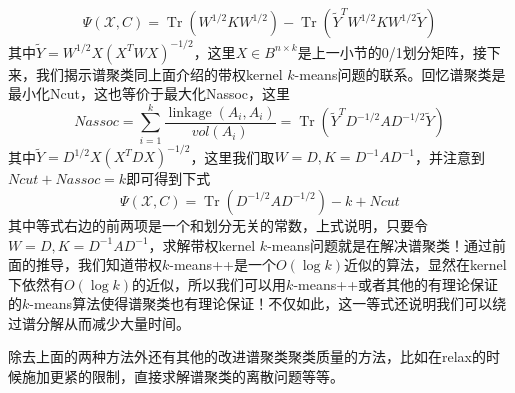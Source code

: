 \begin{equation}
	\Psi(\mathcal{X},C) = \operatorname{Tr}\left(W^{1 / 2} K W^{1 / 2}\right)-\operatorname{Tr}\left(\tilde{Y}^{T} W^{1 / 2} K W^{1 / 2} \tilde{Y}\right)
\end{equation}
其中$\tilde{Y} = W^{1/2}X(X^TWX)^{-1/2}$，这里$X\in B^{n\times k}$是上一小节的0/1划分矩阵，接下来，我们揭示谱聚类同上面介绍的带权kernel $k$-means问题的联系。回忆谱聚类是最小化Ncut，这也等价于最大化Nassoc，这里
\begin{equation}
	Nassoc=\sum_{i=1}^k \frac{\operatorname{linkage}(A_i,A_i)}{vol(A_i)} = \operatorname{Tr}(\tilde{Y}^TD^{-1/2}AD^{-1/2}\tilde{Y})
\end{equation}
其中$\tilde{Y} = D^{1/2}X(X^TDX)^{-1/2}$，这里我们取$W=D,K=D^{-1}AD^{-1}$，并注意到$Ncut+Nassoc=k$即可得到下式
\begin{equation}
	\label{eq: wkk_spectral_clustering}
	\Psi(\mathcal{X},C) = \operatorname{Tr}\left(D^{-1 / 2} A D^{-1 / 2}\right) - k + Ncut
\end{equation}
其中等式右边的前两项是一个和划分无关的常数，上式说明，只要令$W=D,K=D^{-1}AD^{-1}$，求解带权kernel $k$-means问题就是在解决谱聚类！通过前面的推导，我们知道带权$k$-means++是一个$O(\log k)$近似的算法，显然在kernel下依然有$O(\log k)$的近似，所以我们可以用$k$-means++或者其他的有理论保证的$k$-means算法使得谱聚类也有理论保证！不仅如此，这一等式还说明我们可以绕过谱分解从而减少大量时间。

除去上面的两种方法外还有其他的改进谱聚类聚类质量的方法，比如在relax的时候施加更紧的限制，直接求解谱聚类的离散问题等等。

